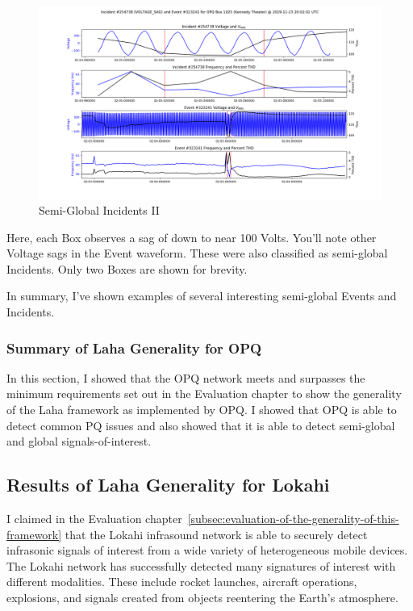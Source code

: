 \begin{figure}[H]
    \centering
    \includegraphics[width=\linewidth]{figures/vsag_g_2.png}
    \caption{Semi-Global Incidents II}
    \label{fig:i_2}
\end{figure}

Here, each Box observes a sag of down to near 100 Volts. You'll note other Voltage sags in the Event waveform. These were also classified as semi-global Incidents. Only two Boxes are shown for brevity.

In summary, I've shown examples of several interesting semi-global Events and Incidents.

\subsubsection{Summary of Laha Generality for OPQ}

In this section, I showed that the OPQ network meets and surpasses the minimum requirements set out in the Evaluation chapter to show the generality of the Laha framework as implemented by OPQ. I showed that OPQ is able to detect common PQ issues and also showed that it is able to detect semi-global and global signals-of-interest.

\subsection{Results of Laha Generality for Lokahi}\label{subsec:results-of-laha-generality-for-lokahi}

I claimed in the Evaluation chapter~\ref{subsec:evaluation-of-the-generality-of-this-framework} that the Lokahi infrasound network is able to securely detect infrasonic signals of interest from a wide variety of heterogeneous mobile devices. The Lokahi network has successfully detected many signatures of interest with different modalities. These include rocket launches, aircraft operations, explosions, and signals created from objects reentering the Earth's atmosphere.

